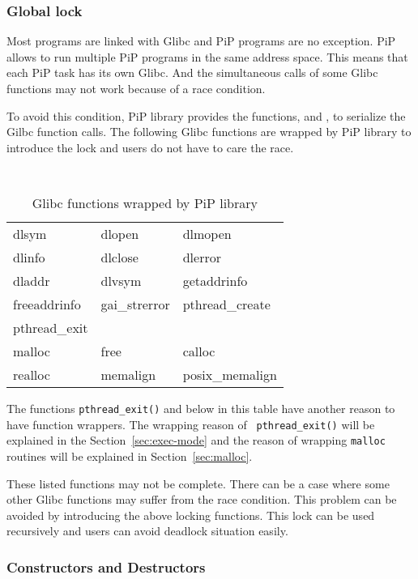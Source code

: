 \subsubsection{Global lock}

Most programs are linked with Glibc and PiP programs are no
exception. PiP allows to run multiple PiP programs in the same address
space. This means that each PiP task has its own Glibc. And the
simultaneous calls of some Glibc functions may not work because of a
race condition. 

To avoid this condition, PiP library provides the functions,
 and , to 
serialize the Gilbc function calls. The following Glibc functions are
wrapped by PiP library to introduce the lock and users do not have to
care the race. 

\begin{table}[ht]
  \centering
  \caption{Glibc functions wrapped by PiP library}\label{tbl:pip-wrapper}
  \vspace{3mm}
  \tt
  \begin{tabular}{lll}
    \hline
    dlsym	&
    dlopen	&
    dlmopen	\\
    dlinfo	&
    dlclose	&
    dlerror	\\
    dladdr	&
    dlvsym	&
    getaddrinfo	\\
    freeaddrinfo &
    gai_strerror &
    pthread_create \\
    \hline
    pthread_exit \\
    \hline
    malloc 	&
    free	&
    calloc	\\
    realloc	&
    memalign 	&
    posix_memalign \\
    \hline
  \end{tabular}
\end{table}

The functions {\tt pthread\_exit()} and below in this table have
another reason to have function wrappers. The wrapping reason of {\tt
  pthread\_exit()} will be explained in the
Section~\ref{sec:exec-mode} and the reason of wrapping {\tt malloc}
routines will be explained in Section~\ref{sec:malloc}. 

These listed functions may not be complete. There can
be a case where some other Glibc functions may suffer from the
race condition. This problem can be avoided by introducing the above
locking functions. This lock can be used recursively and users can
avoid deadlock situation easily. 

\subsubsection{Constructors and Destructors}

